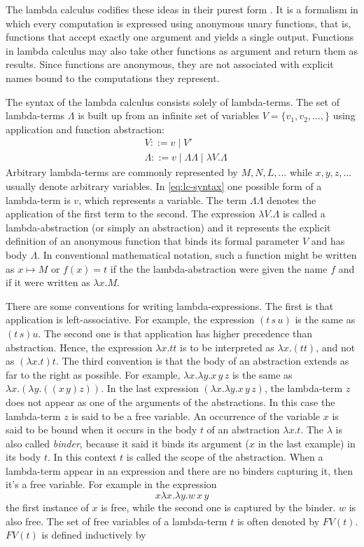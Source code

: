 The lambda calculus codifies these ideas in their purest form \cite{types-and-programming-languages}. It is a formalism in which every computation is expressed using anonymous unary functions, that is, functions that accept exactly one argument and yields a single output. Functions in lambda calculus may also take other functions as argument and return them as results. Since functions are anonymous, they are not associated with explicit names bound to the computations they represent.

The syntax of the lambda calculus consists solely of lambda-terms. The set of lambda-terms $\Lambda$ is built up from an infinite set of variables $V=\{v_1, v_2, \dots, \}$ using application and function abstraction:
\begin{align}
&V ::= v \mid V' \label{eq:lc-infinite-variables} \\
&\Lambda ::= v \mid \Lambda \Lambda \mid \lambda V.\Lambda \label{eq:lc-syntax}
\end{align}
Arbitrary lambda-terms are commonly represented by $M, N, L, \dots$ while $x,y,z, \dots$ usually denote arbitrary variables. In \ref{eq:lc-syntax} one possible form of a lambda-term is $v$, which represents a variable. The term $\Lambda \Lambda$ denotes the application of the first term to the second. The expression $\lambda V.\Lambda$ is called a lambda-abstraction (or simply an abstraction) and it represents the explicit definition of an anonymous function that binds its formal parameter $V$ and has body $\Lambda$. In conventional mathematical notation, such a function might be written as $x \mapsto M$ or $f(x) = t$ if the the lambda-abstraction were given the name $f$ and if it were written as $\lambda x.M$. 

There are some conventions for writing lambda-expressions. The first is that application is left-associative. For example, the expression $(t\,s\,u)$ is the same as $(t\,s)u$. The second one is that application has higher precedence than abstraction. Hence, the expression $\lambda x.tt$ is to be interpreted as $\lambda x.(tt)$, and not as $(\lambda x.t)t$. The third convention is that the body of an abstraction extends as far to the right as possible. For example, $\lambda x.\lambda y.x\,y\,z$ is the same as $\lambda x.(\lambda y.((x\,y)z))$. In the last expression $(\lambda x.\lambda y.x\,y\,z)$, the lambda-term $z$ does not appear as one of the arguments of the abstractions. In this case the lambda-term $z$ is said to be a free variable. An occurrence of the variable $x$ is said to be bound when it occurs in the
body $t$ of an abstraction $\lambda x.t$. The $\lambda$ is also called \textit{binder}, because it said it binds its argument ($x$ in the last example) in its body $t$. In this context $t$ is called the scope of the abstraction. When a lambda-term appear in an expression and there are no binders capturing it, then it's a free variable. For example in the expression
\[
x\lambda x.\lambda y.w\,x\,y
\]
the first instance of $x$ is free, while the second one is captured by the binder. $w$ is also free. The set of free variables of a lambda-term $t$ is often denoted by $FV(t)$. $FV(t)$ is defined inductively by

